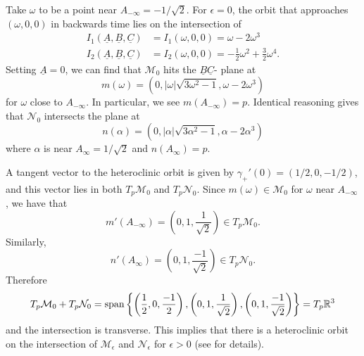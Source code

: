 Take \(\omega\) to be a point near \(A_{-\infty} = - 1/\sqrt 2\). For \(\epsilon = 0\), the orbit that approaches \((\omega, 0, 0)\) in backwards time lies on the intersection of 
\begin{equation*}
	\begin{aligned}
		I_1(\underline A, \underline B, \underline C) &= I_1(\omega, 0, 0) = \omega - 2\omega^3 \\
		I_2(\underline A, \underline B, \underline C) &= I_2(\omega, 0, 0) = - \frac 1 2 \omega^2 + \frac 3 2 \omega^4.
	\end{aligned}
\end{equation*}
Setting \(\underline A = 0\), we can find that \(\mathcal M_0\) hits the \(\underline B \underline C\)- plane at 
\begin{equation*}
	m(\omega) = (0, |\omega| \sqrt{3\omega^2 -1 }, \omega - 2\omega^3)
\end{equation*}
for \(\omega\) close to \(A_{-\infty}\). In particular, we see \(m(A_{-\infty}) = p\). Identical reasoning gives that \(\mathcal N_0\) intersects the plane at 
\begin{equation*}\label{intersection-with-plane}
	n(\alpha) = (0, |\alpha| \sqrt{3\alpha^2 -1 }, \alpha - 2\alpha^3)
\end{equation*}
where \(\alpha\) is near \(A_\infty = 1 / \sqrt 2\) and \(n (A_{\infty} ) = p\).

A tangent vector to the heteroclinic orbit is given by \(\gamma_{+}'(0) = (1/2, 0, -1/2)\), and this vector lies in both \(T_p\mathcal M_0\) and \(T_p \mathcal N_0\). Since \(m(\omega) \in \mathcal M_0\) for \(\omega\) near \(A_{-\infty}\), we have that 
\begin{equation*}
	m'(A_{-\infty}) = \left( 0, 1, \frac  1 {\sqrt 2} \right) \in T_p \mathcal M_0.
\end{equation*}
Similarly,
\begin{equation*}
	n'(A_{\infty}) = \left( 0, 1, \frac  {-1} {\sqrt 2} \right) \in T_p \mathcal N_0.
\end{equation*}
Therefore
\begin{equation*}
	T_p \mathcal M_0 + T_p \mathcal N_0 = \mathrm{span} \left\{ \left(\frac 1 2 , 0, \frac{-1} 2\right),  \left( 0, 1, \frac  1 {\sqrt 2} \right) ,  \left( 0, 1, \frac  {-1} {\sqrt 2} \right) \right\} = T_p\mathbb{R}^3
\end{equation*}
and the intersection is transverse. This implies that there is a heteroclinic orbit on the intersection of \(\mathcal M_\epsilon\) and \(\mathcal N_\epsilon\) for \(\epsilon > 0\) (see \cite[Chp.~6]{arnold1988geometrical} for details). 


